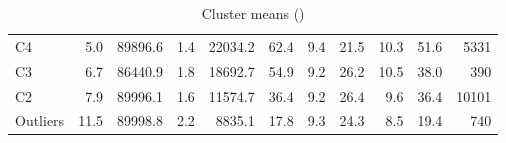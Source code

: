 \begin{table}
\begin{tabular}{l|rrrr|rrrrr|r}
C4  &         5.0 &       89896.6 &     1.4 &                     22034.2 &          62.4 &          9.4 &            21.5 &           10.3 &          51.6 &  5331 \\
C3  &         6.7 &       86440.9 &     1.8 &                     18692.7 &          54.9 &          9.2 &            26.2 &           10.5 &          38.0 &   390 \\
C2  &         7.9 &       89996.1 &     1.6 &                     11574.7 &          36.4 &          9.2 &            26.4 &            9.6 &          36.4 &  10101 \\
Outliers  &        11.5 &       89998.8 &     2.2 &                      8835.1 &          17.8 &          9.3 &            24.3 &            8.5 &          19.4 &   740 \\
\bottomrule
\end{tabular}
 \label{table:d10_gmm_mean}
 \caption{Cluster means (\dten)}
 \end{table}
 
 
 \begin{comment}
 C2 contains the fastest simulations, which take an average of $11.5\times 10^3$ rounds to reach the new fundamental. This group is also the one with the largest overshoot. 
 
 
C7 contains simulations 


Mareket makers are the agents that respond to 


Slow trader match chartist coeincidence
Instead mm match chartists 
If 
Due to the high latency of the slow traders, any order submitted by a slow trader matchng a chartist order i

 \end{comment}

